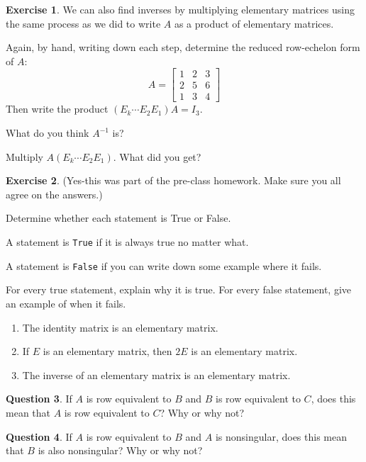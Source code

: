 \documentclass[handout]{beamer}
\newcommand{\fn}{\insertframenumber}
\theoremstyle{definition}
\newtheorem{exercise}{Exercise}
\newtheorem{question}[exercise]{Question}
\renewcommand{\emph}[1]{{\color{blue}\texttt{#1}}}
\begin{document}
\begin{frame}{\fn}
	\begin{exercise}
		We can also find inverses by multiplying elementary matrices using the same process as we did to write $A$ as a product of elementary matrices.
		
		Again, by hand, writing down each step, determine the reduced row-echelon form of $A$:
			\[A=\begin{bmatrix}1&2&3\\2&5&6\\1&3&4\end{bmatrix}\]
		Then write the product $(E_k\cdots E_2E_1)A=I_3$.
		
		What do you think $A^{-1}$ is?
		
		Multiply $A(E_k\cdots E_2E_1)$.  What did you get?
	\end{exercise}
\end{frame}

\begin{frame}{\fn}
\begin{exercise}
	(Yes-this was part of the pre-class homework. Make sure you all agree on the answers.)
	
	Determine whether each statement is True or False.
	
	A statement is \emph{True} if it is always true no matter what.
	
	A statement is \emph{False} if you can write down some example where it fails.
	
	For every true statement, explain why it is true.
	For every false statement, give an example of when it fails.
	
	\begin{enumerate}[label=(\alph*)]
		\item The identity matrix is an elementary matrix.
		\item If $E$ is an elementary matrix, then $2E$ is an elementary matrix.
		\item The inverse of an elementary matrix is an elementary matrix.
	\end{enumerate}
\end{exercise}
\end{frame}

\begin{frame}{\fn}
	\begin{question}
		If $A$ is row equivalent to $B$ and $B$ is row equivalent to $C$, does this mean that $A$ is row equivalent to $C$? Why or why not?
	\end{question}
	\begin{question}
		If $A$ is row equivalent to $B$ and $A$ is nonsingular, does this mean that $B$ is also nonsingular? Why or why not?
	\end{question}
\end{frame}
\end{document}

